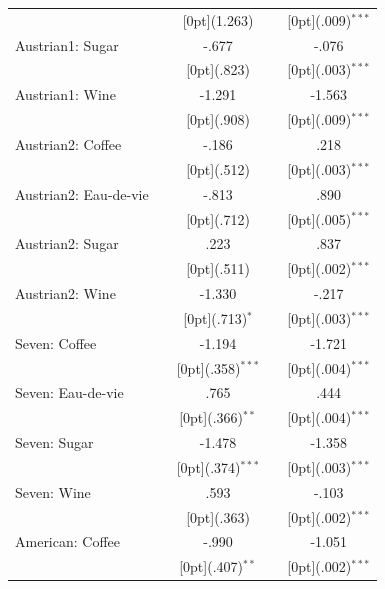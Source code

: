 \documentclass[12pt,a4paper,titlepage]{article}
\begin{document}
{\begin{tabular*}{\textwidth}{@{\extracolsep{\fill}}lcccc}
&	&	\raisebox{.7ex}[0pt]{\scriptsize (1.263)} &	&	\raisebox{.7ex}[0pt]{\scriptsize (.009)$^{***}$} \\
Austrian1: Sugar &	&	-.677 &	&	-.076 \\
&	&	\raisebox{.7ex}[0pt]{\scriptsize (.823)} &	&	\raisebox{.7ex}[0pt]{\scriptsize (.003)$^{***}$} \\
Austrian1: Wine &	&	-1.291 &	&	-1.563 \\
&	&	\raisebox{.7ex}[0pt]{\scriptsize (.908)} &	&	\raisebox{.7ex}[0pt]{\scriptsize (.009)$^{***}$} \\
Austrian2: Coffee &	&	-.186 &	&	.218 \\
&	&	\raisebox{.7ex}[0pt]{\scriptsize (.512)} &	&	\raisebox{.7ex}[0pt]{\scriptsize (.003)$^{***}$} \\
Austrian2: Eau-de-vie &	&	-.813 &	&	.890 \\
&	&	\raisebox{.7ex}[0pt]{\scriptsize (.712)} &	&	\raisebox{.7ex}[0pt]{\scriptsize (.005)$^{***}$} \\
Austrian2: Sugar &	&	.223 &	&	.837 \\
&	&	\raisebox{.7ex}[0pt]{\scriptsize (.511)} &	&	\raisebox{.7ex}[0pt]{\scriptsize (.002)$^{***}$} \\
Austrian2: Wine &	&	-1.330 &	&	-.217 \\
&	&	\raisebox{.7ex}[0pt]{\scriptsize (.713)$^{*}$} &	&	\raisebox{.7ex}[0pt]{\scriptsize (.003)$^{***}$} \\
Seven: Coffee &	&	-1.194 &	&	-1.721 \\
&	&	\raisebox{.7ex}[0pt]{\scriptsize (.358)$^{***}$} &	&	\raisebox{.7ex}[0pt]{\scriptsize (.004)$^{***}$} \\
Seven: Eau-de-vie &	&	.765 &	&	.444 \\
&	&	\raisebox{.7ex}[0pt]{\scriptsize (.366)$^{**}$} &	&	\raisebox{.7ex}[0pt]{\scriptsize (.004)$^{***}$} \\
Seven: Sugar &	&	-1.478 &	&	-1.358 \\
&	&	\raisebox{.7ex}[0pt]{\scriptsize (.374)$^{***}$} &	&	\raisebox{.7ex}[0pt]{\scriptsize (.003)$^{***}$} \\
Seven: Wine &	&	.593 &	&	-.103 \\
&	&	\raisebox{.7ex}[0pt]{\scriptsize (.363)} &	&	\raisebox{.7ex}[0pt]{\scriptsize (.002)$^{***}$} \\
American: Coffee &	&	-.990 &	&	-1.051 \\
&	&	\raisebox{.7ex}[0pt]{\scriptsize (.407)$^{**}$} &	&	\raisebox{.7ex}[0pt]{\scriptsize (.002)$^{***}$} \\

\end{tabular*}}
\end{document}

